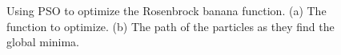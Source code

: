 \documentclass[master]{thesis}
\begin{document}
\begin{sidewayspage} %
    \vspace{-1em}
    \begin{figure} %
         \hfill
        \caption{Using PSO to optimize the Rosenbrock banana function.  (a)  The function to optimize.  (b)  The path of the particles as they find the global minima.}
    \end{figure}
\end{sidewayspage}
\end{document}
